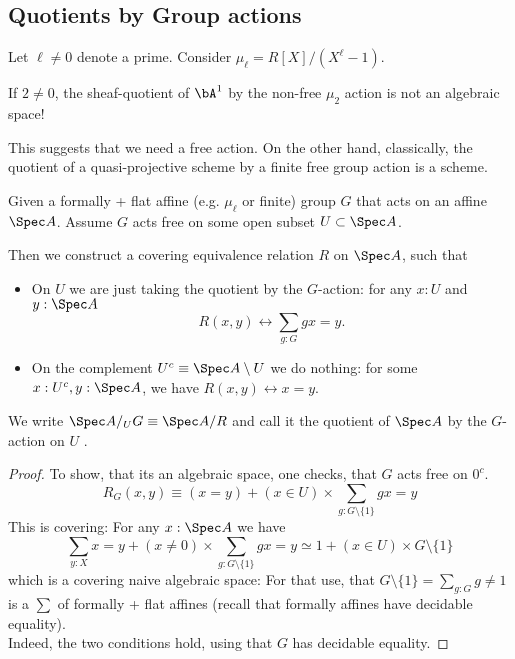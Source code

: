 \subsection{Quotients by Group actions}
Let $\ell \neq 0$ denote a prime. Consider $\mu_\ell = R[X] / (X^\ell - 1)$.
\begin{example}
	If $2 \neq 0$, the sheaf-quotient of $\bA^1$ by the non-free $\mu_2$ action is not an algebraic space!
\end{example}
This suggests that we need a free action. On the other hand, classically, the quotient of a quasi-projective scheme by a finite free group action is a scheme.
\begin{construction}
	Given a formally \etale + flat affine (e.g. $\mu_\ell$ or finite) group $G$ that acts on an affine $\Spec A$. Assume $G$ acts free on some open subset $U \subset \Spec A$.  %
	
	Then we construct a covering equivalence relation $R$ on $\Spec A$, such that
	\begin{itemize}
		\item On $U$ we are just taking the quotient by the $G$-action: for any $x : U$  and $y : \Spec A$
		\[R(x,y) \leftrightarrow \sum_{g : G} g x  = y. \]
		\item On the complement $U^c \equiv \Spec A \setminus U$ we do nothing: for some $x : U^c , y : \Spec A $, we have $R(x,y) \leftrightarrow x = y$.
	\end{itemize}
	We write $\Spec A /_U G \equiv \Spec A / R$ and call it the quotient of $\Spec A$ by the $G$-action on $U$ .
\end{construction}
\begin{proof}
	To show, that its an algebraic space, one checks, that $G$ acts free on $0^c$.
	\[R_{G}(x,y) \equiv (x = y) + (x \in U) \times \sum_{g : G \setminus \{1\}} g x = y\]
	This is covering: For any $x : \Spec A$ we have
	\[\sum_{y : X} x = y + (x \neq 0) \times \sum_{g : G \setminus \{1\}} g x = y \simeq 1 + (x \in U) \times G \setminus \{1\}\]
	which is a covering naive algebraic space: For that use, that $G \setminus \{1\} = \sum_{g : G} g \neq 1$ is a $\sum$ of formally \etale + flat affines (recall that formally \etale affines have decidable equality). \\
	Indeed, the two conditions hold, using that $G$ has decidable equality.
\end{proof}

